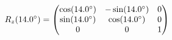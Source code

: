 \documentclass[preview]{standalone}
\begin{document}
\begin{align*}
\special{dvisvgm:raw <g id='unique000'>}R_z(14.0^\circ) = \begin{pmatrix} \cos(14.0^\circ) & -\sin(14.0^\circ) & 0 \\ \sin(14.0^\circ) & \cos(14.0^\circ) & 0 \\ 0 & 0 & 1 \end{pmatrix}\special{dvisvgm:raw </g>}
\end{align*}
\end{document}
